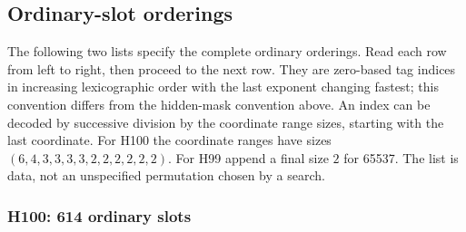 \subsection{Ordinary-slot orderings}
The following two lists specify the complete ordinary orderings.
Read each row from left to right, then proceed to the next row.
They are zero-based tag indices in increasing lexicographic order with
the last exponent changing fastest; this convention differs from the
hidden-mask convention above. An index can be decoded by successive division
by the coordinate range sizes, starting with the last coordinate.
For H100 the coordinate ranges have sizes
$(6,4,3,3,3,3,2,2,2,2,2,2)$. For H99 append a final size $2$ for 65537.
The list is data, not an unspecified permutation chosen by a search.

\subsubsection*{H100: 614 ordinary slots}
